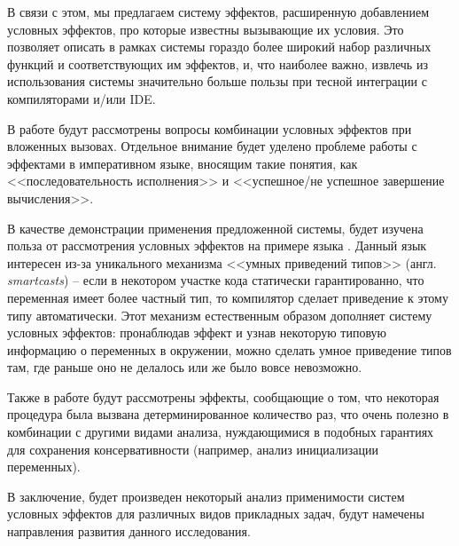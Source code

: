 В связи с этом, мы предлагаем систему эффектов, расширенную добавлением условных эффектов, про которые известны вызывающие их условия. Это позволяет описать в рамках системы гораздо более широкий набор различных функций и соответствующих им эффектов, и, что наиболее важно, извлечь из использования системы значительно больше пользы при тесной интеграции с компиляторами и/или IDE. 

В работе будут рассмотрены вопросы комбинации условных эффектов при вложенных вызовах. Отдельное внимание будет уделено проблеме работы с эффектами в императивном языке, вносящим такие понятия, как <<последовательность исполнения>> и <<успешное/не успешное завершение вычисления>>.

В качестве демонстрации применения предложенной системы, будет изучена польза от рассмотрения условных эффектов на примере языка . Данный язык интересен из-за уникального механизма <<умных приведений типов>> (англ. \emph{smartcasts}) -- если в некотором участке кода статически гарантированно, что переменная имеет более частный тип, то компилятор сделает приведение к этому типу автоматически. Этот механизм естественным образом дополняет систему условных эффектов: пронаблюдав эффект и узнав некоторую типовую информацию о переменных в окружении, можно сделать умное приведение типов там, где раньше оно не делалось или же было вовсе невозможно. 

Также в работе будут рассмотрены эффекты, сообщающие о том, что некоторая процедура была вызвана детерминированное количество раз, что очень полезно в комбинации с другими видами анализа, нуждающимися в подобных гарантиях для сохранения консервативности (например, анализ инициализации переменных).

В заключение, будет произведен некоторый анализ применимости систем условных эффектов для различных видов прикладных задач, будут намечены направления развития данного исследования.

